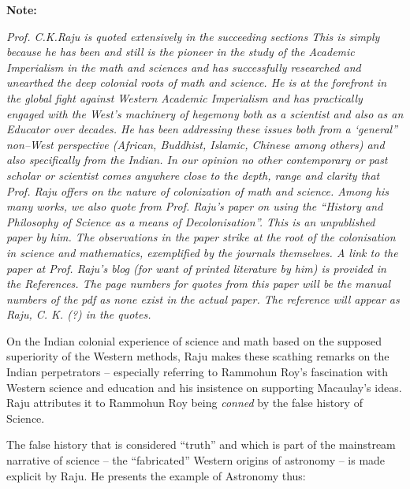 \vskip 4pt

\textbf{Note:}

\vskip 4pt

\textit{Prof. C.K.Raju is quoted extensively in the succeeding sections This is simply because he has been and still is the pioneer in the study of the Academic Imperialism in the math and sciences and has successfully researched and unearthed the deep colonial roots of math and science. He is at the forefront in the global fight against Western Academic Imperialism and has practically engaged with the West’s machinery of hegemony both as a scientist and also as an Educator over decades. He has been addressing these issues both from a ‘general” non–West perspective (African, Buddhist, Islamic, Chinese among others) and also specifically from the Indian. In our opinion no other contemporary or past scholar or scientist comes anywhere close to the depth, range and clarity that Prof. Raju offers on the nature of colonization of math and science. Among his many works, we also quote from Prof. Raju’s paper on using the “History and Philosophy of Science as a means of Decolonisation”. This is an unpublished paper by him. The observations in the paper strike at the root of the colonisation in science and mathematics, exemplified by the journals themselves. A link to the paper at Prof. Raju’s blog (for want of printed literature by him) is provided in the References. The page numbers for quotes from this paper will be the manual numbers of the pdf as none exist in the actual paper. The reference will appear as Raju, C. K. (?) in the quotes.}

\vskip 3pt

On the Indian colonial experience of science and math based on the supposed superiority of the Western methods, Raju makes these scathing remarks on the Indian perpetrators – especially referring to Rammohun Roy’s fascination with Western science and education and his insistence on supporting Macaulay’s ideas. Raju attributes it to Rammohun Roy being \textit{conned} by the false history of Science.

The false history that is considered “truth” and which is part of the mainstream narrative of science – the “fabricated” Western origins of astronomy – is made explicit by Raju. He presents the example of Astronomy thus:

